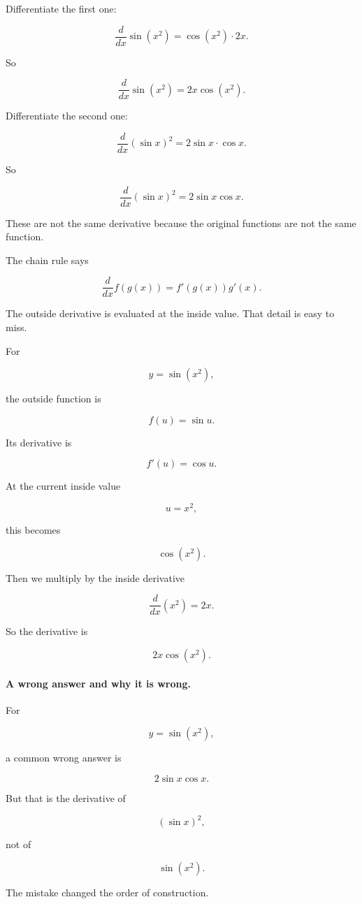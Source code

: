 Differentiate the first one:

\[
\frac{d}{dx}\sin(x^2)
=
\cos(x^2)\cdot 2x.
\]

So

\[
\boxed{
\frac{d}{dx}\sin(x^2)=2x\cos(x^2).
}
\]

Differentiate the second one:

\[
\frac{d}{dx}(\sin x)^2
=
2\sin x\cdot\cos x.
\]

So

\[
\boxed{
\frac{d}{dx}(\sin x)^2=2\sin x\cos x.
}
\]

These are not the same derivative because the original functions are not the same function.

The chain rule says

\[
\boxed{
\frac{d}{dx}f(g(x))=f'(g(x))g'(x).
}
\]

The outside derivative is evaluated at the inside value.  That detail is easy to miss.

For

\[
y=\sin(x^2),
\]

the outside function is

\[
f(u)=\sin u.
\]

Its derivative is

\[
f'(u)=\cos u.
\]

At the current inside value

\[
u=x^2,
\]

this becomes

\[
\cos(x^2).
\]

Then we multiply by the inside derivative

\[
\frac{d}{dx}(x^2)=2x.
\]

So the derivative is

\[
2x\cos(x^2).
\]

\paragraph{A wrong answer and why it is wrong.}
For

\[
y=\sin(x^2),
\]

a common wrong answer is

\[
2\sin x\cos x.
\]

But that is the derivative of

\[
(\sin x)^2,
\]

not of

\[
\sin(x^2).
\]

The mistake changed the order of construction.

